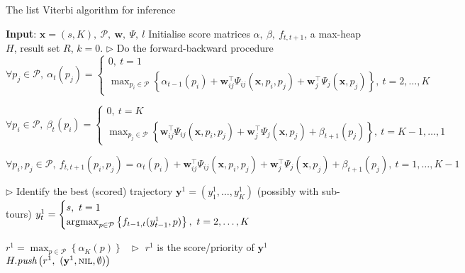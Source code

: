 \begin{algorithm}[htbp]
\caption{The list Viterbi algorithm for inference}
\label{alg:listviterbi}
\begin{algorithmic}[1]
\STATE \textbf{Input}: $\mathbf{x}=(s, K),~ \mathcal{P},~ \mathbf{w},~ \Psi,~ l$
\STATE Initialise score matrices $\alpha,~ \beta,~ f_{t, t+1}$, a max-heap $H$, result set $R$, $k=0$.
\STATE $\triangleright$ Do the forward-backward procedure~\cite{rabiner1989tutorial}
\STATE $\forall p_j \in \mathcal{P},~ \alpha_t(p_j) = 
        \begin{cases}
        0,~ t = 1 \\
        \max_{p_i \in \mathcal{P}} \left\{ \alpha_{t-1}(p_i) + \mathbf{w}_{ij}^\top \Psi_{ij}(\mathbf{x}, p_i, p_j) + 
        \mathbf{w}_j^\top \Psi_j(\mathbf{x}, p_j) \right\},~ t=2,\dots,K
        \end{cases}$

\STATE $\forall p_i \in \mathcal{P},~ \beta_t(p_i) = 
        \begin{cases}
        0,~ t = K \\
        \max_{p_j \in \mathcal{P}} \left\{ \mathbf{w}_{ij}^\top \Psi_{ij}(\mathbf{x}, p_i, p_j) + 
        \mathbf{w}_j^\top \Psi_j(\mathbf{x}, p_j) + \beta_{t+1}(p_j) \right\},~ t = K-1,\dots,1
        \end{cases}$

\STATE $\forall p_i, p_j \in \mathcal{P},~ f_{t,t+1}(p_i, p_j) = \alpha_t(p_i) + \mathbf{w}_{ij}^\top \Psi_{ij}(\mathbf{x}, p_i, p_j) + 
                              \mathbf{w}_j^\top \Psi_j(\mathbf{x}, p_j) + \beta_{t+1}(p_j),~ t = 1,\dots,K-1$

\STATE $\triangleright$ Identify the best (scored) trajectory $\mathbf{y}^1=(y_1^1,\dots,y_K^1)$ (possibly with sub-tours)
\STATE $y_t^1 = \begin{cases}
                s,~ t = 1 \\
                \operatorname*{argmax}_{p \in \mathcal{P}} \left\{ f_{t-1,t}(y_{t-1}^1, p) \right\},~ t = 2,\dots,K
                \end{cases}$

\STATE $r^1 = \max_{p \in \mathcal{P}} \left\{ \alpha_{K}(p) \right\}~~~ \triangleright$ $r^1$ is the score/priority of $\mathbf{y}^1$
\STATE $H.\textit{push}\left(r^1,~ (\mathbf{y}^1, \textsc{nil}, \emptyset) \right)$


\end{algorithmic}
\end{algorithm}
